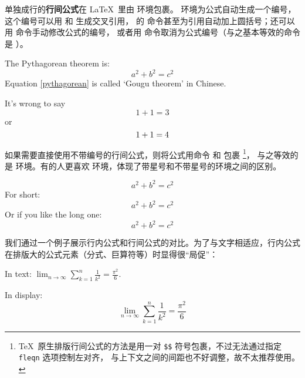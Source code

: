 单独成行的\textbf{行间公式}在 \LaTeX\ 里由  环境包裹。
 环境为公式自动生成一个编号，这个编号可以用  和  生成交叉引用，
 的  命令甚至为引用自动加上圆括号；还可以用  命令手动修改公式的编号，
或者用  命令取消为公式编号（与之基本等效的命令是 ）。

\begin{example}
The Pythagorean theorem is:
\begin{equation}
a^2 + b^2 = c^2 \label{pythagorean}
\end{equation}
Equation \eqref{pythagorean} is
called `Gougu theorem' in Chinese.
\end{example}

\begin{example}
It's wrong to say
\begin{equation}
1 + 1 = 3 \tag{dumb}
\end{equation}
or
\begin{equation}
1 + 1 = 4 \notag
\end{equation}
\end{example}

\cmdindex{[,]}
如果需要直接使用不带编号的行间公式，则将公式用命令 \cmd{[} 和 \cmd{]} 包裹%
\footnote{\TeX\ 原生排版行间公式的方法是用一对 \texttt{\$\$} 符号包裹，不过无法通过指定 \texttt{fleqn} 选项控制左对齐，
与上下文之间的间距也不好调整，故不太推荐使用。}，
与之等效的是  环境。有的人更喜欢  环境，体现了带星号和不带星号的环境之间的区别。

\begin{example}
\begin{equation*}
a^2 + b^2 = c^2
\end{equation*}
For short:
\[ a^2 + b^2 = c^2 \]
Or if you like the long one:
\begin{displaymath}
a^2 + b^2 = c^2
\end{displaymath}
\end{example}

我们通过一个例子展示行内公式和行间公式的对比。为了与文字相适应，行内公式在排版大的公式元素（分式、巨算符等）时显得很“局促”：

\begin{example}
In text:
$\lim_{n \to \infty}
\sum_{k=1}^n \frac{1}{k^2}
= \frac{\pi^2}{6}$.

In display:
\[
\lim_{n \to \infty}
\sum_{k=1}^n \frac{1}{k^2}
= \frac{\pi^2}{6}
\]
\end{example}

